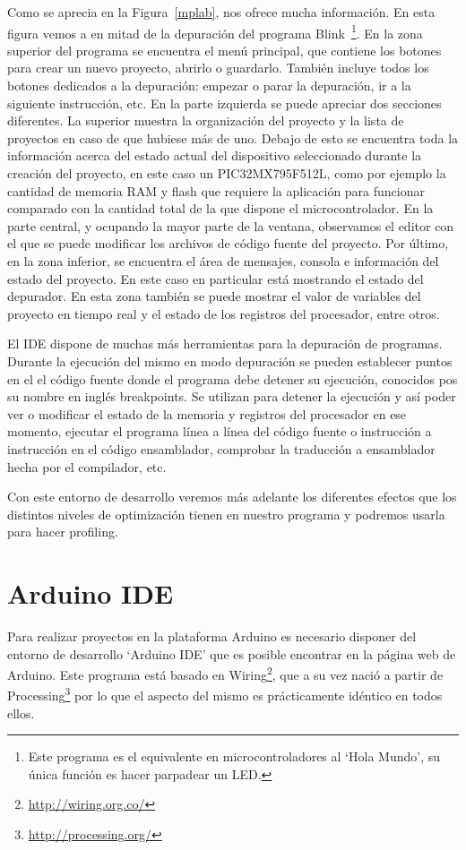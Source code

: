 
Como se aprecia en la Figura~\ref{mplab},  nos ofrece mucha información. En esta figura vemos a  en mitad de la depuración del programa Blink~\footnote{Este programa es el equivalente en microcontroladores al `Hola Mundo', su única función es hacer parpadear un LED.}. En la zona superior del programa se encuentra el menú principal, que contiene los botones para crear un nuevo proyecto, abrirlo o guardarlo. También incluye todos los botones dedicados a la depuración: empezar o parar la depuración, ir a la siguiente instrucción, etc. En la parte izquierda se puede apreciar dos secciones diferentes. La superior muestra la organización del proyecto y la lista de proyectos en caso de que hubiese más de uno. Debajo de esto se encuentra toda la información acerca del estado actual del dispositivo seleccionado durante la creación del proyecto, en este caso un PIC32MX795F512L, como por ejemplo la cantidad de memoria RAM y flash que requiere la aplicación para funcionar comparado con la cantidad total de la que dispone el microcontrolador. En la parte central, y ocupando la mayor parte de la ventana, observamos el editor con el que se puede modificar los archivos de código fuente del proyecto. Por último, en la zona inferior, se encuentra el área de mensajes, consola e información del estado del proyecto. En este caso en particular está mostrando el estado del depurador. En esta zona también se puede mostrar el valor de variables del proyecto en tiempo real y el estado de los registros del procesador, entre otros.

El IDE dispone de muchas más herramientas para la depuración de programas. Durante la ejecución del mismo en modo depuración se pueden establecer puntos en el el código fuente donde el programa debe detener su ejecución, conocidos pos su nombre en inglés breakpoints. Se utilizan para detener la ejecución y así poder ver o modificar el estado de la memoria y registros del procesador en ese momento, ejecutar el programa línea a línea del código fuente o instrucción a instrucción en el código ensamblador, comprobar la traducción a ensamblador hecha por el compilador, etc.

Con este entorno de desarrollo veremos más adelante los diferentes efectos que los distintos niveles de optimización tienen en nuestro programa y podremos usarla para hacer profiling.

\section{Arduino IDE}
Para realizar proyectos en la plataforma Arduino es necesario disponer del entorno de desarrollo `Arduino IDE' que es posible encontrar en la página web de Arduino. Este programa está basado en Wiring\footnote{\url{http://wiring.org.co/}}, que a su vez nació a partir de Processing\footnote{\url{http://processing.org/}} por lo que el aspecto del mismo es prácticamente idéntico en todos ellos.

